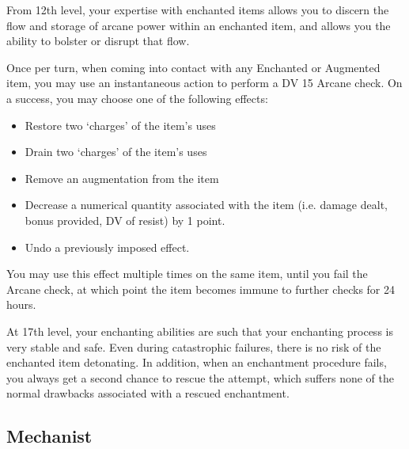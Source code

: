 {
	From 12th level, your expertise with enchanted items allows you to discern the flow and storage of arcane power within an enchanted item, and allows you the ability to bolster or disrupt that flow. 
	
	Once per turn, when coming into contact with any Enchanted or Augmented item, you may use an instantaneous action to perform a DV 15 Arcane check. On a success, you may choose one of the following effects:
	\begin{itemize}
		\item Restore two `charges' of the item's uses
		\item Drain two `charges' of the item's uses
		\item Remove an augmentation from the item 
		\item Decrease a numerical quantity associated with the item (i.e. damage dealt, bonus provided, DV of resist) by 1 point. 
		\item Undo a previously imposed effect. 
	\end{itemize}  
	
	You may use this effect multiple times on the same item, until you fail the Arcane check, at which point the item becomes immune to further checks for 24 hours. 
}

{
	At 17th level, your enchanting abilities are such that your enchanting process is very stable and safe. Even during catastrophic failures, there is no risk of the enchanted item detonating. In addition, when an enchantment procedure fails, you always get a second chance to rescue the attempt,  which suffers none of the normal drawbacks associated with a rescued enchantment.  
}


\subsection*{Mechanist}


